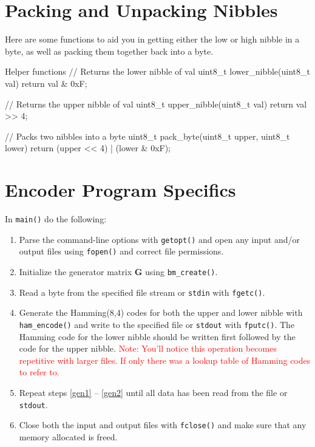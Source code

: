 \documentclass[11pt]{article}
\begin{document}
\section{Packing and Unpacking Nibbles}

Here are some functions to aid you in getting either the low or high
nibble in a byte, as well as packing them together back into a byte.

\begin{codelisting}{Helper functions}
 // Returns the lower nibble of val
 uint8_t lower_nibble(uint8_t val) {
     return val & 0xF;
 }

 // Returns the upper nibble of val
 uint8_t upper_nibble(uint8_t val) {
     return val >> 4;
 }

 // Packs two nibbles into a byte
 uint8_t pack_byte(uint8_t upper, uint8_t lower) {
     return (upper << 4) | (lower & 0xF);
 }
\end{codelisting}

\section{Encoder Program Specifics}

In \texttt{main()} do the following:
\begin{enumerate}
    \item Parse the command-line options with \texttt{getopt()} and open
      any input and/or output files using \texttt{fopen()} and correct
      file permissions.

    \item Initialize the generator matrix $\boldsymbol{G}$ using \texttt{bm\_create()}.

    \item Read a byte from the specified file stream or \texttt{stdin}
      with \texttt{fgetc()}. \label{gen1}

    \item Generate the Hamming(8,4) codes for both the upper and lower
      nibble with \texttt{ham\_encode()} and write to the specified
      \label{gen2} file or \texttt{stdout} with \texttt{fputc()}. The
      Hamming code for the lower nibble should be written first followed
      by the code for the upper nibble. \textcolor{red}{Note: You'll
      notice this operation becomes repetitive with larger files. If
    only there was a lookup table of Hamming codes to refer to.}

    \item Repeat steps \ref{gen1} -- \ref{gen2} until all data has been
      read from the file or \texttt{stdout}.

    \item Close both the input and output files with \texttt{fclose()}
      and make sure that any memory allocated is freed.
\end{enumerate}
\end{document}
